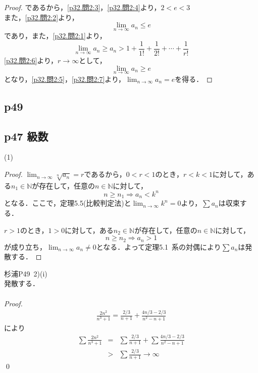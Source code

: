 \documentclass[dvipdfmx,uplatex,11pt]{jsarticle}
\begin{document}
\begin{leftbar}
\begin{proof}
		であるから，\eqref{p32.問2:3}，\eqref{p32.問2:4}より，$2<e<3$\\
		また，\eqref{p32.問2:2}より，
		\begin{equation}
			\label{p32.問2:5}
			\lim_{n \to \infty} a_n \le e
		\end{equation}
		であり，また，\eqref{p32.問2:1}より，
		\begin{equation}
			\label{p32.問2:6}
			\lim_{n \to \infty} a_n \ge a_n > 1 + \frac{1}{1!} + \frac{1}{2!} + \cdots + \frac{1}{r!}
		\end{equation}
		\eqref{p32.問2:6}より，$r \to \infty$として，
		\begin{equation}
			\label{p32.問2:7}
			\lim_{n \to \infty} a_n \ge e
		\end{equation}
		となり，\eqref{p32.問2:5}，\eqref{p32.問2:7}より，$\lim_{n \to \infty} a_n =e$を得る．
	\end{proof}
\end{leftbar}

\subsection{p49}

\subsection{p47 級数}

(1)
\begin{leftbar}
	\begin{proof}
		$\lim_{n \to \infty} \sqrt[n]{a_n} =r$であるから，$0<r<1$のとき，$r<k<1$に対して，ある$n_1 \in \mathbb{N}$が存在して，任意の$n \in \mathbb{N}$に対して，
		\[
			n \ge n_1 \Longrightarrow a_n<k^n
		\]
		となる．ここで，定理5.5(比較判定法)と$\lim_{n \to \infty} k^n =0$より，$\sum a_n$は収束する．\par 
		$r>1$のとき，$1>0$に対して，ある$n_2 \in \mathbb{N}$が存在して，任意の$n \in \mathbb{N}$に対して，
		\[
			n \ge n_2 \Longrightarrow a_n >1
		\]
		が成り立ち，$\lim_{n \to \infty} a_n \ne 0$となる．よって定理5.1~系の対偶により$\sum a_n$は発散する．
	\end{proof}
\end{leftbar}

\newpage

\begin{screen}
	杉浦P49~2)(i)\\
	発散する．\\
	\dotfill \\
	{\it Proof.}
	\begin{eqnarray*}
	\frac{2n^2}{n^3+1}=\frac{2/3}{n+1}+\frac{4n/3-2/3}{n^2-n+1}
	\end{eqnarray*}
	により
	\begin{eqnarray*}
	\sum \frac{2n^2}{n^3+1}&=&\sum \frac{2/3}{n+1}+\sum \frac{4n/3-2/3}{n^2-n+1} \\
	&>&\sum \frac{2/3}{n+1} \rightarrow \infty
	\end{eqnarray*}
	\qed
	\end{screen}
	
\end{document}
